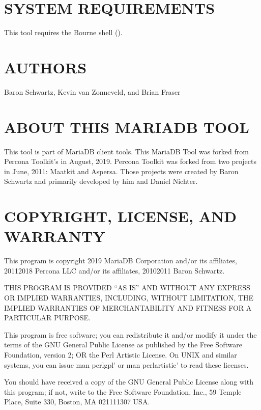 \documentclass[letterpaper,10pt,english]{sphinxmanual}
\begin{document}
\section{SYSTEM REQUIREMENTS}
\label{\detokenize{mariadb-system-summary:system-requirements}}
\sphinxAtStartPar
This tool requires the Bourne shell ().


\section{AUTHORS}
\label{\detokenize{mariadb-system-summary:authors}}
\sphinxAtStartPar
Baron Schwartz, Kevin van Zonneveld, and Brian Fraser


\section{ABOUT THIS MARIADB TOOL}
\label{\detokenize{mariadb-system-summary:about-this-mariadb-tool}}
\sphinxAtStartPar
This tool is part of MariaDB client tools. This MariaDB Tool was forked from
Percona Toolkit’s  in August, 2019. Percona Toolkit was
forked from two projects in June, 2011: Maatkit and Aspersa.  Those projects
were created by Baron Schwartz and primarily developed by him and Daniel Nichter.


\section{COPYRIGHT, LICENSE, AND WARRANTY}
\label{\detokenize{mariadb-system-summary:copyright-license-and-warranty}}
\sphinxAtStartPar
This program is copyright 2019 MariaDB Corporation and/or its affiliates,
2011\sphinxhyphen{}2018 Percona LLC and/or its affiliates, 2010\sphinxhyphen{}2011 Baron Schwartz.

\sphinxAtStartPar
THIS PROGRAM IS PROVIDED “AS IS” AND WITHOUT ANY EXPRESS OR IMPLIED
WARRANTIES, INCLUDING, WITHOUT LIMITATION, THE IMPLIED WARRANTIES OF
MERCHANTABILITY AND FITNESS FOR A PARTICULAR PURPOSE.

\sphinxAtStartPar
This program is free software; you can redistribute it and/or modify it under
the terms of the GNU General Public License as published by the Free Software
Foundation, version 2; OR the Perl Artistic License.  On UNIX and similar
systems, you can issue \textasciigrave{}man perlgpl’ or \textasciigrave{}man perlartistic’ to read these
licenses.

\sphinxAtStartPar
You should have received a copy of the GNU General Public License along with
this program; if not, write to the Free Software Foundation, Inc., 59 Temple
Place, Suite 330, Boston, MA  02111\sphinxhyphen{}1307  USA.
\end{document}
